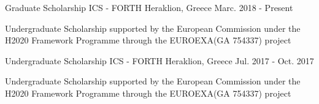 

\begin{cventries}


  \cventry
    {Graduate Scholarship} %
    {ICS - FORTH} %
    {Heraklion, Greece} %
    {Marc. 2018 - Present} %
    {
      \begin{cvitems} %
          \item{Undergraduate Scholarship supported by the European
          Commission under the H2020 Framework Programme through the
          EUROEXA(GA 754337) project}
      \end{cvitems}
    }

  \cventry
    {Undergraduate Scholarship} %
    {ICS - FORTH} %
    {Heraklion, Greece} %
    {Jul. 2017 - Oct. 2017} %
    {
      \begin{cvitems} %
          \item{Undergraduate Scholarship supported by the European
          Commission under the H2020 Framework Programme through the
          EUROEXA(GA 754337) project}
      \end{cvitems}
    }

\end{cventries}
